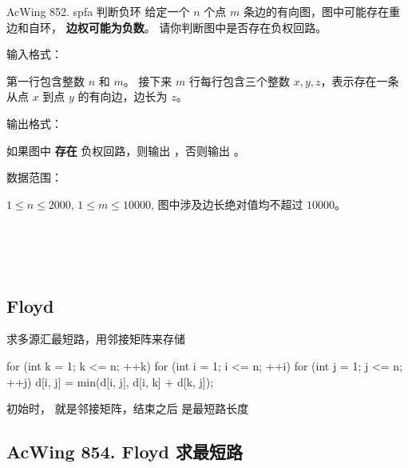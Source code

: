 \begin{titledbox}{AcWing 852. spfa 判断负环}
    给定一个 $n$ 个点 $m$ 条边的有向图，图中可能存在重边和自环， \textbf{边权可能为负数}。 请你判断图中是否存在负权回路。

    输入格式：

    第一行包含整数 $n$ 和 $m$。 接下来 $m$ 行每行包含三个整数 $x,y,z$，表示存在一条从点 $x$ 到点 $y$ 的有向边，边长为 $z$。

    输出格式：

    如果图中 \textbf{存在} 负权回路，则输出 ，否则输出 。

    数据范围：

    $1 \le n \le 2000$, $1 \le m \le 10000$, 图中涉及边长绝对值均不超过 $10000$。

    \begin{inputblock}
         \\
         \\
         \\
    \end{inputblock}
    \begin{outputblock}
    \end{outputblock}
\end{titledbox}

\subsection{Floyd}
求多源汇最短路，用邻接矩阵来存储 

\begin{mycpponecol}[Floyd 算法]
    for (int k = 1; k <= n; ++k) {
        for (int i = 1; i <= n; ++i) {
            for (int j = 1; j <= n; ++j) {
                d[i, j] = min(d[i, j], d[i, k] + d[k, j]);
            }
        }
    }
\end{mycpponecol}

初始时，  就是邻接矩阵，结束之后  是最短路长度

\subsection{AcWing 854. Floyd 求最短路}

